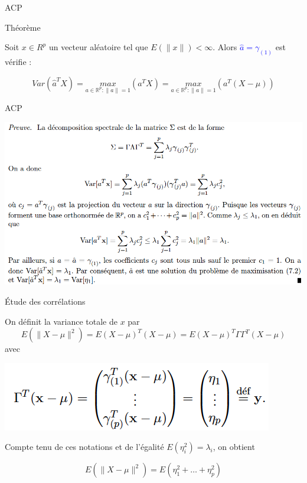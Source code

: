 \documentclass[12pt]{beamer}
\begin{document}
\begin{frame}{ACP }

\begin{block}{Théorème}

Soit $x \in R^p$ un vecteur aléatoire tel que $E(\parallel  x \parallel) < \infty$. Alors  \textcolor{blue}{$\hat{a}= \gamma_{(1)}$} est
vérifie : 

 $$ Var(\hat{a}^TX)=\underset{a \in \mathbb{R}^p : \parallel a \parallel=1}{max} (a^TX)=\underset{a \in \mathbb{R}^p : \parallel a \parallel=1}{max} (a^T(X-\mu)) $$ 
 
\end{block}

\end{frame}



\begin{frame}{ACP }

\includegraphics[scale=0.37]{Thee.png}

\end{frame}


\begin{frame}{Étude des corrélations }

 On définit la variance totale de $x$ par $$ E(\parallel  X-\mu\parallel^2)=E(X-\mu)^T(X-\mu)=E(X-\mu)^T\Gamma\Gamma^T (X-\mu)$$ avec 
 
 \centering 
 \includegraphics[scale=0.5]{Gamma.png}
 
 Compte tenu de ces notations et de l’égalité 
 $E(\eta_i^2) = \lambda_i$, on obtient 
 
$$ E(\parallel  X-\mu\parallel^2)=E(\eta_1^2+\ldots +\eta_p^2)$$ 

\end{frame}
\end{document}
